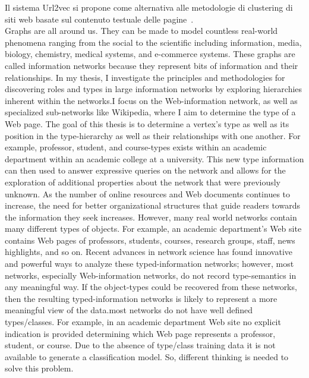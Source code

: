 

Il sistema Url2vec si propone come alternativa alle metodologie di clustering di siti web basate sul contenuto testuale delle pagine~\cite{Rajaraman11}. 
\\
Graphs are all around us. They can be made to model countless real-world phenomena ranging
from the social to the scientific including information, media, biology, chemistry, medical systems,
and e-commerce systems. These graphs are called information networks because they represent
bits of information and their relationships. In my thesis, I investigate the principles and methodologies for discovering roles and types
in large information networks by exploring hierarchies inherent within the networks.I focus on
the Web-information network, as well as specialized sub-networks like Wikipedia, where I aim to
determine the type of a Web page. The goal of this thesis is to determine a vertex’s type as well as its position in the type-hierarchy
as well as their relationships with one another. For example, professor, student, and course-types
exists within an academic department within an academic college at a university. This new type
information can then used to answer expressive queries on the network and allows for the exploration
of additional properties about the network that were previously unknown. As the number of online resources and Web documents continues to increase, the need for better
organizational structures that guide readers towards the information they seek increases. However, many real world networks contain many different types
of objects. For example, an academic department’s Web site contains Web pages of professors,
students, courses, research groups, staff, news highlights, and so on. Recent advances in network
science has found innovative and powerful ways to analyze these typed-information networks; however,
most networks, especially Web-information networks, do not record type-semantics in any
meaningful way. If the object-types could be recovered from these networks, then the resulting
typed-information networks is likely to represent a more meaningful view of the data.most networks do not have well defined types/classes. For example, in an academic department
Web site no explicit indication is provided determining which Web page represents a professor,
student, or course. Due to the absence of type/class training data it is not available to generate a
classification model. So, different thinking is needed to solve this problem.




